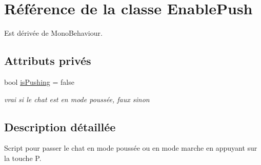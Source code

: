 \hypertarget{class_enable_push}{\section{Référence de la classe Enable\+Push}
\label{class_enable_push}
}


Est dérivée de Mono\+Behaviour.

\subsection*{Attributs privés}
\begin{DoxyCompactItemize}
\item 
\hypertarget{class_enable_push_afeb6ad6b549aa25c4e78bea96de0c338}{bool \hyperlink{class_enable_push_afeb6ad6b549aa25c4e78bea96de0c338}{is\+Pushing} = false}\label{class_enable_push_afeb6ad6b549aa25c4e78bea96de0c338}

\begin{DoxyCompactList}\small\item\em vrai si le chat est en mode poussée, faux sinon \end{DoxyCompactList}\end{DoxyCompactItemize}


\subsection{Description détaillée}
Script pour passer le chat en mode poussée ou en mode marche en appuyant sur la touche P. 